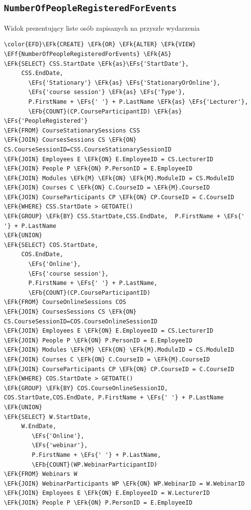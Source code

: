 \documentclass[11pt]{article}
\newcommand{\EFs}[1]{\textcolor{EFs}{#1}} %
\newcommand{\EFk}[1]{\textcolor{EFk}{\textbf{#1}}} %
\newcommand{\EFb}[1]{\textcolor{EFb}{\textbf{#1}}} %
\newcommand{\EFf}[1]{\textcolor{EFf}{#1}} %
\begin{document}
\subsection{\texttt{NumberOfPeopleRegisteredForEvents}}
\label{sec:orga63400e}
Widok prezentujący liste osób zapisanych na przyszłe wydarzenia
\begin{Code}
\begin{Verbatim}
\color{EFD}\EFk{CREATE} \EFk{OR} \EFk{ALTER} \EFk{VIEW} \EFf{NumberOfPeopleRegisteredForEvents} \EFk{AS}
\EFk{SELECT} CSS.StartDate \EFk{as}\EFs{'StartDate'},
     CSS.EndDate, 
       \EFs{'Stationary'} \EFk{as} \EFs{'StationaryOrOnline'},
       \EFs{'course session'} \EFk{as} \EFs{'Type'},
       P.FirstName + \EFs{' '} + P.LastName \EFk{as} \EFs{'Lecturer'}, 
       \EFb{COUNT}(CP.CourseParticipantID) \EFk{as} \EFs{'PeopleRegistered'}
\EFk{FROM} CourseStationarySessions CSS 
\EFk{JOIN} CoursesSessions CS \EFk{ON} CS.CourseSessionID=CSS.CourseStationarySessionID
\EFk{JOIN} Employees E \EFk{ON} E.EmployeeID = CS.LecturerID
\EFk{JOIN} People P \EFk{ON} P.PersonID = E.EmployeeID
\EFk{JOIN} Modules \EFk{M} \EFk{ON} \EFk{M}.ModuleID = CS.ModuleID
\EFk{JOIN} Courses C \EFk{ON} C.CourseID = \EFk{M}.CourseID
\EFk{JOIN} CourseParticipants CP \EFk{ON} CP.CourseID = C.CourseID
\EFk{WHERE} CSS.StartDate > GETDATE()
\EFk{GROUP} \EFk{BY} CSS.StartDate,CSS.EndDate,  P.FirstName + \EFs{' '} + P.LastName
\EFk{UNION} 
\EFk{SELECT} COS.StartDate,
     COS.EndDate,
       \EFs{'Online'},
       \EFs{'course session'},
       P.FirstName + \EFs{' '} + P.LastName, 
       \EFb{COUNT}(CP.CourseParticipantID)
\EFk{FROM} CourseOnlineSessions COS 
\EFk{JOIN} CoursesSessions CS \EFk{ON} CS.CourseSessionID=COS.CourseOnlineSessionID
\EFk{JOIN} Employees E \EFk{ON} E.EmployeeID = CS.LecturerID
\EFk{JOIN} People P \EFk{ON} P.PersonID = E.EmployeeID
\EFk{JOIN} Modules \EFk{M} \EFk{ON} \EFk{M}.ModuleID = CS.ModuleID
\EFk{JOIN} Courses C \EFk{ON} C.CourseID = \EFk{M}.CourseID
\EFk{JOIN} CourseParticipants CP \EFk{ON} CP.CourseID = C.CourseID
\EFk{WHERE} COS.StartDate > GETDATE()
\EFk{GROUP} \EFk{BY} COS.CourseOnlineSessionID, COS.StartDate,COS.EndDate, P.FirstName + \EFs{' '} + P.LastName
\EFk{UNION}
\EFk{SELECT} W.StartDate,
     W.EndDate, 
        \EFs{'Online'},
        \EFs{'webinar'},
        P.FirstName + \EFs{' '} + P.LastName,
        \EFb{COUNT}(WP.WebinarParticipantID)
\EFk{FROM} Webinars W
\EFk{JOIN} WebinarParticipants WP \EFk{ON} WP.WebinarID = W.WebinarID
\EFk{JOIN} Employees E \EFk{ON} E.EmployeeID = W.LecturerID
\EFk{JOIN} People P \EFk{ON} P.PersonID = E.EmployeeID

\end{Verbatim}
\end{Code}
\end{document}
